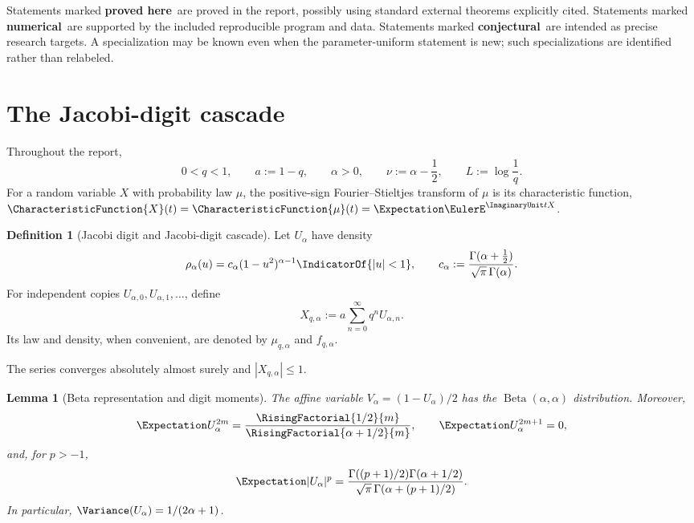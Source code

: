 \documentclass[11pt]{article}
\newtheorem{lemma}[theorem]{Lemma}
\theoremstyle{definition}
\newtheorem{definition}[theorem]{Definition}
\theoremstyle{remark}
\newcommand{\statusP}{\textcolor{green!35!black}{\textbf{proved here}}}
\newcommand{\statusC}{\textcolor{orange!70!black}{\textbf{conjectural}}}
\newcommand{\statusN}{\textcolor{blue!55!black}{\textbf{numerical}}}
\begin{document}
Statements marked \statusP\ are proved in the report, possibly using standard
external theorems explicitly cited.  Statements marked \statusN\ are supported
by the included reproducible program and data.  Statements marked
\statusC\ are intended as precise research targets.  A specialization may be
known even when the parameter-uniform statement is new; such specializations
are identified rather than relabeled.

\section{The Jacobi-digit cascade}
\label{sec:definition}

Throughout the report,
\[
 0<q<1,\qquad a:=1-q,\qquad \alpha>0,
 \qquad \nu:=\alpha-\frac12,
 \qquad L:=\log\frac1q.
\]
For a random variable $X$ with probability law $\mu$, the positive-sign
Fourier--Stieltjes transform of $\mu$ is its characteristic function,
\(\CharacteristicFunction{X}(t)=\CharacteristicFunction{\mu}(t)
=\Expectation\EulerE^{\ImaginaryUnit tX}\).

\begin{definition}[Jacobi digit and Jacobi-digit cascade]
Let \(U_\alpha\) have density
\begin{equation}
 \rho_\alpha(u)
 =c_\alpha(1-u^2)^{\alpha-1}\IndicatorOf{|u|<1},
 \qquad
 c_\alpha:=\frac{\Gamma(\alpha+\tfrac12)}{\sqrt\pi\,\Gamma(\alpha)}.
 \label{eq:digit-density}
\end{equation}
For independent copies \(U_{\alpha,0},U_{\alpha,1},\ldots\), define
\begin{equation}
 X_{q,\alpha}:=a\sum_{n=0}^{\infty}q^nU_{\alpha,n}.
 \label{eq:cascade-definition}
\end{equation}
Its law and density, when convenient, are denoted by
\(\mu_{q,\alpha}\) and \(f_{q,\alpha}\).
\end{definition}

The series converges absolutely almost surely and \(|X_{q,\alpha}|\le1\).

\begin{lemma}[Beta representation and digit moments]
\label{lem:digit-moments}
The affine variable \(V_\alpha=(1-U_\alpha)/2\) has the
\(\operatorname{Beta}(\alpha,\alpha)\) distribution.  Moreover,
\begin{equation}
 \Expectation U_\alpha^{2m}=\frac{\RisingFactorial{1/2}{m}}{\RisingFactorial{\alpha+1/2}{m}},
 \qquad
 \Expectation U_\alpha^{2m+1}=0,
 \label{eq:digit-even-moment}
\end{equation}
and, for \(p>-1\),
\begin{equation}
 \Expectation|U_\alpha|^p
 =\frac{\Gamma((p+1)/2)\Gamma(\alpha+1/2)}
 {\sqrt\pi\,\Gamma(\alpha+(p+1)/2)}.
 \label{eq:digit-absolute-moment}
\end{equation}
In particular, \(\Variance(U_\alpha)=1/(2\alpha+1)\).
\end{lemma}
\end{document}
